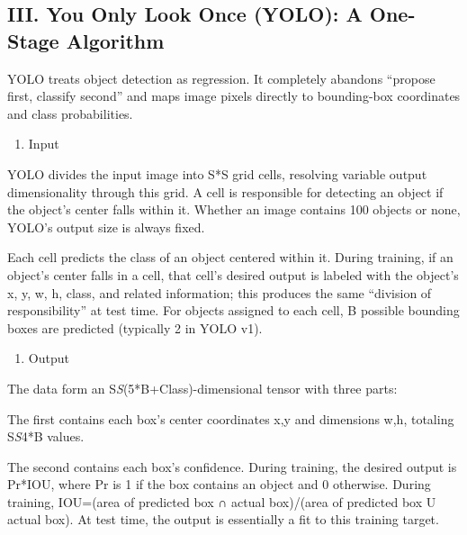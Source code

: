 \hypertarget{iii.-you-only-look-once-yolo-a-one-stage-algorithm}{%
\subsection{III. You Only Look Once (YOLO): A One-Stage Algorithm}\label{iii.-you-only-look-once-yolo-a-one-stage-algorithm}}

YOLO treats object detection as regression. It completely abandons ``propose first, classify second'' and maps image pixels directly to bounding-box coordinates and class probabilities.

\begin{enumerate}
\def\labelenumi{\arabic{enumi}.}
\tightlist
\item
  Input
\end{enumerate}

YOLO divides the input image into S*S grid cells, resolving variable output dimensionality through this grid. A cell is responsible for detecting an object if the object's center falls within it. Whether an image contains 100 objects or none, YOLO's output size is always fixed.

Each cell predicts the class of an object centered within it. During training, if an object's center falls in a cell, that cell's desired output is labeled with the object's x, y, w, h, class, and related information; this produces the same ``division of responsibility'' at test time. For objects assigned to each cell, B possible bounding boxes are predicted (typically 2 in YOLO v1).

\begin{enumerate}
\def\labelenumi{\arabic{enumi}.}
\setcounter{enumi}{1}
\tightlist
\item
  Output
\end{enumerate}

The data form an S\emph{S}(5*B+Class)-dimensional tensor with three parts:

The first contains each box's center coordinates x,y and dimensions w,h, totaling S\emph{S}4*B values.

The second contains each box's confidence. During training, the desired output is Pr*IOU, where Pr is 1 if the box contains an object and 0 otherwise. During training, IOU=(area of predicted box ∩ actual box)/(area of predicted box U actual box). At test time, the output is essentially a fit to this training target.

